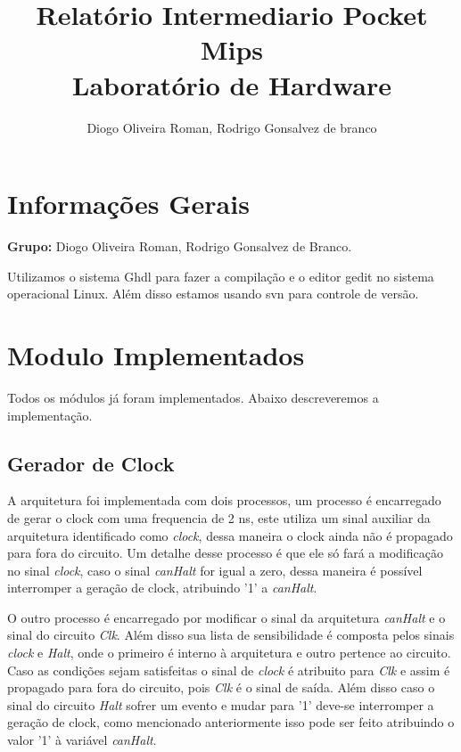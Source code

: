 \documentclass[12pt]{article}
\title{Relatório Intermediario Pocket Mips\\ Laboratório de Hardware}
\author{Diogo Oliveira Roman\inst{1}, Rodrigo Gonsalvez de branco\inst{1}}
\begin{document}
 

\maketitle


\section{Informações Gerais}

\textbf{Grupo:} Diogo Oliveira Roman, Rodrigo Gonsalvez de Branco.

Utilizamos o sistema Ghdl para fazer a compilação e o editor gedit no sistema operacional Linux. Além disso estamos usando svn para controle de versão.

\section{Modulo Implementados} \label{sec:modulos}

Todos os módulos já foram implementados. Abaixo descreveremos a implementação.

\subsection{Gerador de Clock}

A arquitetura foi implementada com dois processos, um processo é encarregado de gerar o clock com uma frequencia de 2 ns, este utiliza um sinal auxiliar da arquitetura identificado como \textit{clock}, dessa maneira o clock ainda não é propagado para fora do circuito. Um detalhe desse processo é que ele só fará a modificação no sinal \textit{clock}, caso o sinal \textit{canHalt} for igual a zero, dessa maneira é possível interromper a geração de clock, atribuindo '1' a \textit{canHalt}.

O outro processo é encarregado por modificar o sinal da arquitetura \textit{canHalt} e o sinal do circuito \textit{Clk}. Além disso sua lista de sensibilidade é composta pelos sinais \textit{clock} e \textit{Halt}, onde o primeiro é interno à arquitetura e outro pertence ao circuito. Caso as condições sejam satisfeitas o sinal de \textit{clock} é atribuito para \textit{Clk} e assim é propagado para fora do circuito, pois \textit{Clk} é o sinal de saída. Além disso caso o sinal do circuito \textit{Halt} sofrer um evento e mudar para '1' deve-se interromper a geração de clock, como mencionado anteriormente isso pode ser feito atribuindo o valor '1' à variável \textit{canHalt}.
\end{document}
